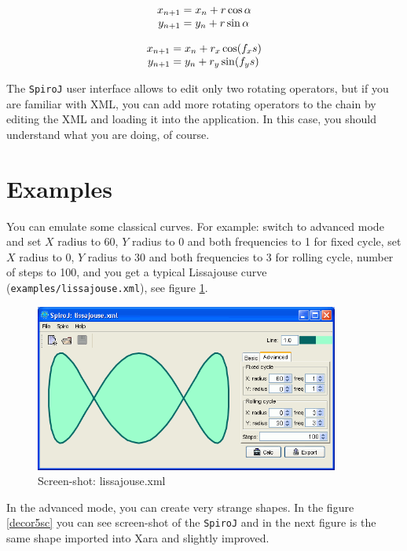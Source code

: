 \documentclass[12pt, a4paper]{article}
\newcommand{\url}[1]{\texttt{#1}}
\newcommand{\appName}{\texttt{SpiroJ}}
\begin{document}
\begin{equation}\label{basic}
  \begin{array}{r@{\;=\;}l}
    x_{n+1} & x_n + r \cos{\alpha} \\
    y_{n+1} & y_n + r \sin{\alpha} 
  \end{array}
\end{equation}

\begin{equation}\label{advanced}
  \begin{array}{r@{\;=\;}l}
    x_{n+1} & x_n + r_x \cos(f_x s) \\
    y_{n+1} & y_n + r_y \sin(f_y s) 
  \end{array}
\end{equation}

The \appName{} user interface allows to edit only two rotating operators, but if you are familiar with XML, you can add more rotating operators to the chain by editing the XML and loading it into the application. In this case, you should understand what you are doing, of course.

\section{Examples}

You can emulate some classical curves. For example: switch to advanced mode and set $X$ radius to 60, $Y$ radius to 0 and both frequencies to 1 for fixed cycle, set $X$ radius to 0, $Y$ radius to 30 and both frequencies to 3 for rolling cycle, number of steps to 100, and you get a typical Lissajouse curve (\url{examples/lissajouse.xml}), see figure \ref{lissajouse}.

\begin{figure}[ht]\centering
  \includegraphics[width=10cm]{lissajouse_screen}
  \caption{Screen-shot: lissajouse.xml}
  \label{lissajouse}
\end{figure}

In the advanced mode, you can create very strange shapes. In the figure \ref{decor5sc} you can see screen-shot of the \appName{} and in the next figure is the same shape imported into Xara and slightly improved.
\end{document}
